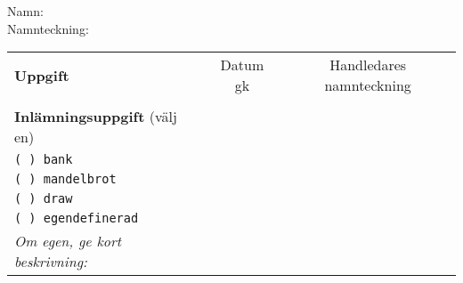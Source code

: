 \vspace{2.5em}\noindent Namn: \dotfill\\

\vspace{1em}\noindent Namnteckning: \dotfill\\

\newcommand{\LabRow}[1]{\\[-1.1em] \texttt{#1} & \dotfill &  \dotfill  \\ \addlinespace }

\begin{table}[h]
\centering
\vspace{1em}
\begin{tabular}{lcc}
\toprule \addlinespace 
{\sffamily\bfseries\small Uppgift} & {\sffamily\small Datum gk} &	{\sffamily\small Handledares namnteckning}\\ \addlinespace \midrule \\[-0.5em]

\addlinespace \midrule \addlinespace
{\sffamily\small {\bfseries Inlämningsuppgift} (välj en)	} & & \\ \addlinespace\addlinespace %
\texttt{( ) bank}  &  &  \\
\texttt{( ) mandelbrot} \\  
\texttt{( ) draw}  \\
\texttt{( ) egendefinerad}  \\
\textit{\small Om egen, ge kort beskrivning:}\\
\bottomrule
\end{tabular}
\end{table}
